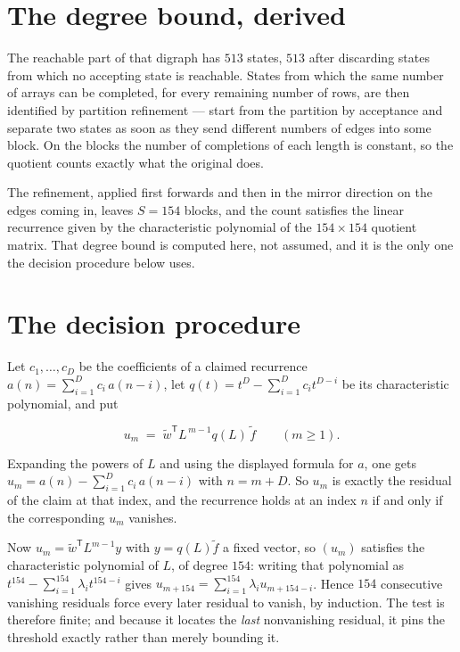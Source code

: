 \documentclass[11pt]{article}
\theoremstyle{definition}
\begin{document}
\section{The degree bound, derived}

The reachable part of that digraph has $513$ states, $513$ after discarding states from which no accepting state is reachable. States from which the same number of arrays can be completed, for every remaining number of rows, are then identified by partition refinement --- start from the partition by acceptance and separate two states as soon as they send different numbers of edges into some block. On the blocks the number of completions of each length is constant, so the quotient counts exactly what the original does.

The refinement, applied first forwards and then in the mirror direction on the edges coming in, leaves $S = 154$ blocks, and the count satisfies the linear recurrence given by the characteristic polynomial of the $154 \times 154$ quotient matrix. That degree bound is computed here, not assumed, and it is the only one the decision procedure below uses.

\section{The decision procedure}

Let $c_1,\dots,c_D$ be the coefficients of a claimed recurrence $a(n) = \sum_{i=1}^{D} c_i\,a(n-i)$, let $q(t) = t^{D} - \sum_{i=1}^{D} c_i t^{D-i}$ be its characteristic polynomial, and put

\[u_m \;=\; \tilde w^{\mathsf T} L^{\,m-1} q(L)\,\tilde f \qquad (m \ge 1).\]

Expanding the powers of $L$ and using the displayed formula for $a$, one gets $u_m = a(n) - \sum_{i=1}^{D} c_i\,a(n-i)$ with $n = m + D$. So $u_m$ is exactly the residual of the claim at that index, and the recurrence holds at an index $n$ if and only if the corresponding $u_m$ vanishes.

Now $u_m = \tilde w^{\mathsf T} L^{m-1} y$ with $y = q(L)\tilde f$ a fixed vector, so $(u_m)$ satisfies the characteristic polynomial of $L$, of degree $154$: writing that polynomial as $t^{154} - \sum_{i=1}^{154} \lambda_i t^{154-i}$ gives $u_{m+154} = \sum_{i=1}^{154} \lambda_i u_{m+154-i}$. Hence $154$ consecutive vanishing residuals force every later residual to vanish, by induction. The test is therefore finite; and because it locates the {\itshape last} nonvanishing residual, it pins the threshold exactly rather than merely bounding it.
\end{document}
